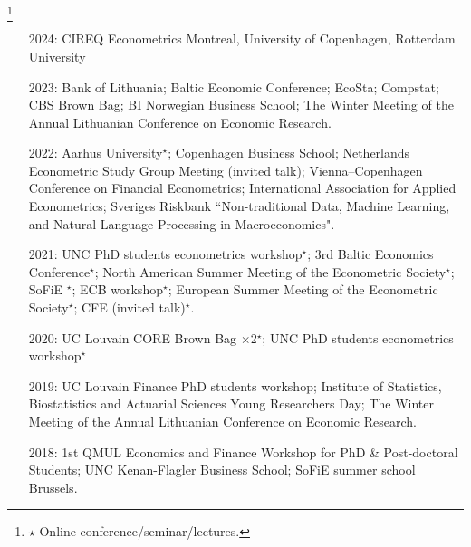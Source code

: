\documentclass[10pt]{article}
\newcommand\blfootnote[1]{%
	\begingroup
	\renewcommand\thefootnote{}\footnote{#1}%
	\addtocounter{footnote}{-1}%
	\endgroup
}
\newcommand{\thestar}{{\Large{\color{blue}\ensuremath{\star}} }}
\newcommand{\thestarnogap}{{\Large{\color{blue}\ensuremath{^\star}}}}
\begin{document}
	\blfootnote{\thestar Online conference/seminar/lectures.} 
	\begin{itemize}[leftmargin=4.5em]
		\setlength\itemsep{-0.1em}
		\item[2024:] CIREQ Econometrics Montreal, University of Copenhagen, Rotterdam University 
		\item[2023:] Bank of Lithuania; Baltic Economic Conference; EcoSta; Compstat; CBS Brown Bag; BI Norwegian Business School; The Winter Meeting of the Annual Lithuanian Conference on Economic Research.
		\item[2022:] Aarhus University\thestarnogap; Copenhagen Business School; Netherlands Econometric Study Group Meeting (invited talk); Vienna–Copenhagen Conference on Financial Econometrics; International Association for Applied Econometrics; Sveriges Riskbank ``Non-traditional Data, Machine Learning, and Natural Language Processing in Macroeconomics".
		\item[2021:] UNC PhD students econometrics workshop\thestarnogap; 3rd Baltic Economics Conference\thestarnogap; North American Summer Meeting of the Econometric Society\thestarnogap; SoFiE \thestarnogap; ECB workshop\thestarnogap; European Summer Meeting of the Econometric Society\thestarnogap; CFE (invited talk)\thestarnogap.
		\item[2020:] UC Louvain CORE Brown Bag $\times$2\thestarnogap; UNC PhD students econometrics workshop\thestarnogap
		\item[2019:] UC Louvain Finance PhD students workshop; Institute of Statistics, Biostatistics and Actuarial Sciences Young Researchers Day; The Winter Meeting of the Annual Lithuanian Conference on Economic Research.
		\item[2018:] 1st QMUL Economics and Finance Workshop for PhD \& Post-doctoral Students; UNC Kenan-Flagler Business School; SoFiE summer school Brussels.
	\end{itemize}
\end{document}
